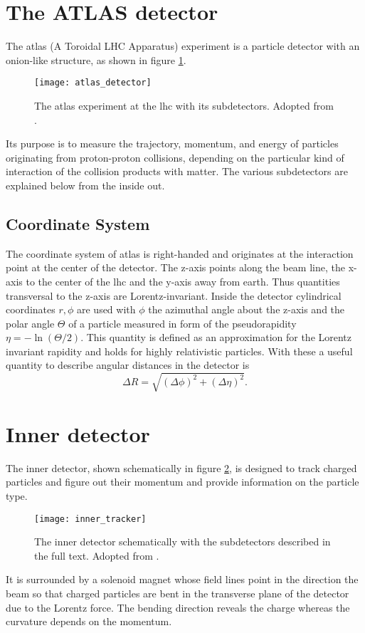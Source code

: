 \section{The ATLAS detector}
The \ac{atlas} (A Toroidal LHC Apparatus) experiment is a particle detector with an onion-like structure, as shown in figure \ref{fig:atlas_detector}.
\begin{figure}
    \centering
    \texttt{[image: atlas\_detector]}
        \caption[]{The \ac{atlas} experiment at the \ac{lhc} with its subdetectors. Adopted from \citep{Pequenao:1095924}.}
    \label{fig:atlas_detector}    
\end{figure}
Its purpose is to measure the trajectory, momentum, and energy of particles originating from proton-proton collisions, depending on the particular kind of interaction of the collision products with matter. The various subdetectors are explained below from the inside out.

\subsection*{Coordinate System}
The coordinate system of \ac{atlas} is right-handed and originates at the interaction point at the center of the detector. The z-axis points along the beam line, the x-axis to the center of the lhc and the y-axis away from earth. Thus quantities transversal to the z-axis are Lorentz-invariant. Inside the detector cylindrical coordinates $r,\phi$ are used with $\phi$ the azimuthal angle about the z-axis and the polar angle $\Theta$ of a particle measured in form of the pseudorapidity $\eta=-\ln(\Theta/2)$. This quantity is defined as an approximation for the Lorentz invariant rapidity and holds for highly relativistic particles. With these a useful quantity to describe angular distances in the detector is
\begin{equation}
    \Delta R = \sqrt{(\Delta\phi)^2+(\Delta \eta)^2}.
\end{equation}

\section{Inner detector}
The inner detector, shown schematically in figure \ref{fig:inner_tracker}, is designed to track charged particles and figure out their momentum and provide information on the particle type. 
\begin{figure}
    \centering
    \texttt{[image: inner\_tracker]}
        \caption[]{The inner detector schematically with the subdetectors described in the full text. Adopted from \citep{Potamianos:2016ptf}.}
    \label{fig:inner_tracker}    
\end{figure}
It is surrounded by a solenoid magnet whose field lines point in the direction the beam so that charged particles are bent in the transverse plane of the detector due to the Lorentz force. The bending direction reveals the charge whereas the curvature depends on the momentum.

